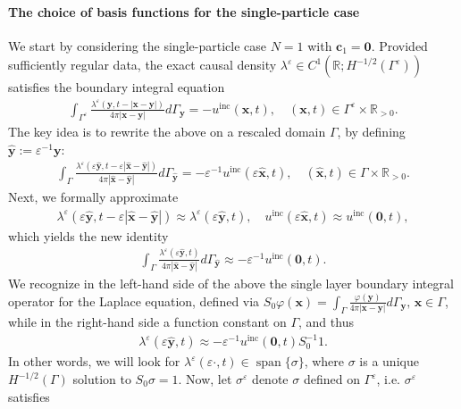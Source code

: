 \documentclass[]{article}
\numberwithin{equation}{section}
\numberwithin{theorem}{section}
\numberwithin{lemma}{section}
\numberwithin{corollary}{section}
\numberwithin{proposition}{section}
\numberwithin{definition}{section}
\newcommand{\bx}{\boldsymbol{x}}
\newcommand{\by}{\boldsymbol{y}}
\newcommand{\re}{\varepsilon}
\begin{document}
	\paragraph{The choice of basis functions for the single-particle case} We start by considering the single-particle case $N=1$ with $\boldsymbol{c}_1=\boldsymbol{0}$.  Provided sufficiently regular data, the exact causal density $\lambda^{\re}\in C^1(\mathbb{R}; H^{-1/2}(\Gamma^{\re}))$ satisfies the boundary integral equation 
	\begin{align*}%
		\int_{\Gamma^{\re}} \frac{ \lambda^{\re}(\boldsymbol{y},t-|\bx-\by|)}{4 \pi |\boldsymbol{x} - \boldsymbol{y}|}d\Gamma_{\by}=-u^{\operatorname{inc}}(\boldsymbol{x}, t), \quad (\bx, t) \in \Gamma^{\re} \times \mathbb{R}_{>0}.
	\end{align*}
	The key idea is to rewrite the above on a rescaled domain $\Gamma$, by defining $\hat{\by}:=\re^{-1}\by$: 
	\begin{align*}%
		\int_{\Gamma}\frac{\lambda^{\re}(\re\hat{\by}, t-\re|\hat{\bx}-\hat{\by}|)}{4\pi|\hat{\bx}-\hat{\by}|}d\Gamma_{\hat{\by}}=-\re^{-1}u^{\operatorname{inc}}(\re\hat{\bx}, t), \quad (\hat{\bx}, t) \in \Gamma \times \mathbb{R}_{>0}.
	\end{align*}
	Next, we formally approximate 
	\begin{align*}%
		\lambda^{\re}(\re\hat{\by}, t-\re|\hat{\bx}-\hat{\by}|)\approx \lambda^{\re}(\re\hat{\by}, t), \quad u^{\operatorname{inc}}(\re\hat{\bx}, t)\approx u^{\operatorname{inc}}(\mathbf{0}, t),
	\end{align*}
	which yields the new identity 
	\begin{align*}%
		\int_{\Gamma}\frac{\lambda^{\re}(\re\hat{\by}, t)}{4\pi|\hat{\bx}-\hat{\by}|}d\Gamma_{\hat{\by}}\approx -\re^{-1}u^{\operatorname{inc}}(\mathbf{0}, t).
	\end{align*}
	We recognize in the left-hand side of the above the single layer boundary integral operator for the Laplace equation, defined via ${S}_0\varphi(\bx)=\int_{\Gamma}\frac{\varphi(\by)}{4\pi|\bx-\by|}d\Gamma_{\by}, \, \bx\in \Gamma$, while in the right-hand side a function constant on $\Gamma$, and thus 
	\begin{align*}%
		\lambda^{\re}(\re\hat{\by},t)\approx -\re^{-1}u^{\operatorname{inc}}(\mathbf{0}, t){S}_0^{-1}1.
	\end{align*}
	In other words, we will look for $\lambda^{\re}(\re \cdot,t)\in \operatorname{span}\{\sigma\}$, where $\sigma$ is a unique $H^{-1/2}(\Gamma)$ solution to ${S}_0\sigma =1$.  Now, let  $\sigma^{\re}$ denote $\sigma$ defined on $\Gamma^{\re}$, i.e. $\sigma^{\re}$ satisfies
\end{document}
